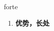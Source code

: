 
\begin{frame}
{\huge forte}
\begin{center}
\begin{enumerate}\Large
  \item \textbf{优势，长处}
\end{enumerate}
\end{center}
\end{frame}
